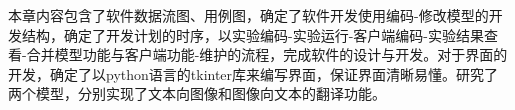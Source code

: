 本章内容包含了软件数据流图、用例图，确定了软件开发使用编码-修改模型的开发结构，确定了开发计划的时序，以实验编码-实验运行-客户端编码-实验结果查看-合并模型功能与客户端功能-维护的流程，完成软件的设计与开发。对于界面的开发，确定了以python语言的tkinter库来编写界面，保证界面清晰易懂。研究了两个模型，分别实现了文本向图像和图像向文本的翻译功能。



